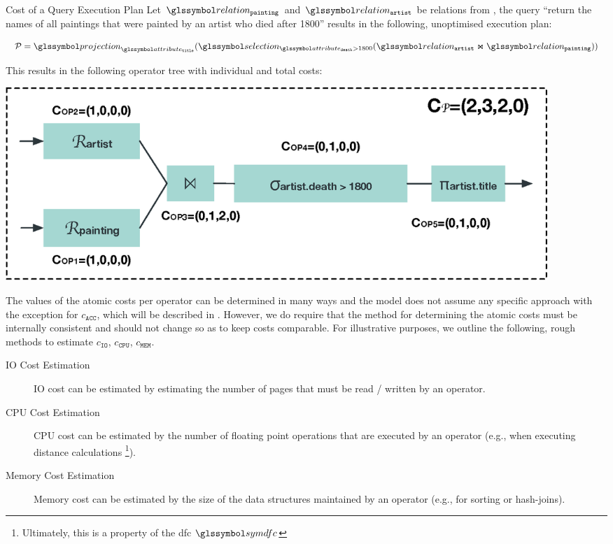 \begin{example}[label=example:cost_model]{Cost of a Query Execution Plan}{}
    Let $\relation_{\mathtt{painting}}$ and $\relation_{\mathtt{artist}}$ be relations from , the query ``return the names of all paintings that were painted by an artist who died after 1800'' results in the following, unoptimised execution plan:

    \begin{equation*}
        \mathcal{P} = \projection_{\attribute_{\mathtt{title}}}(\selection_{\attribute_{\mathtt{death}} > 1800}(\relation_{\mathtt{artist}} \Join \relation_{\mathtt{painting}}))
    \end{equation*}

    This results in the following operator tree with individual and total costs:

    \begin{center}
        \includegraphics[width=0.9\textwidth]{figures/cost_example.eps}
    \end{center}
\end{example}

The values of the atomic costs per operator can be determined in many ways and the model does not assume any specific approach with the exception for $c_{\mathtt{ACC}}$, which will be described in . However, we do require that the method for determining the atomic costs must be internally consistent and should not change so as to keep costs comparable. For illustrative purposes, we outline the following, rough methods to estimate $c_{\mathtt{IO}}$, $c_{\mathtt{CPU}}$, $c_{\mathtt{MEM}}$.

\begin{description}
    \item[IO Cost Estimation] IO cost can be estimated by estimating the number of pages that must be read / written by an operator. 
    \item[CPU Cost Estimation] CPU cost can be estimated by the number of floating point operations that are executed by an operator (e.g., when executing distance calculations \footnote{Ultimately, this is a property of the \acrshort{dfc} $\symdfc$}).
    \item[Memory Cost Estimation] Memory cost can be estimated by the size of the data structures maintained by an operator (e.g., for sorting or hash-joins).
\end{description}


